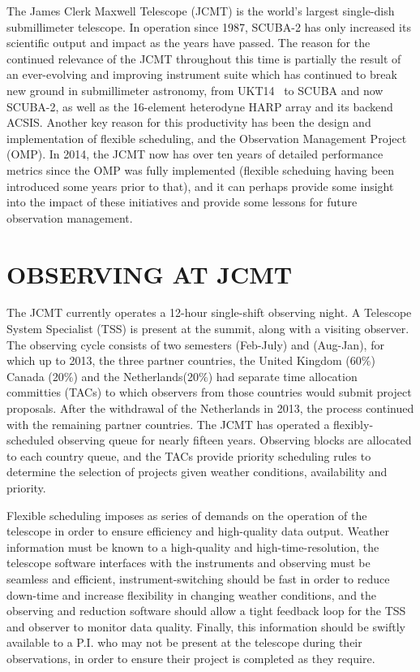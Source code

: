 \documentclass[]{spie}  %
\begin{document}
The James Clerk Maxwell Telescope (JCMT) is the world's largest
single-dish submillimeter telescope. In operation since 1987, SCUBA-2
has only increased its scientific output and impact as the years have
passed. The reason for the continued relevance of the JCMT throughout
this time is partially the result of an ever-evolving and improving
instrument suite which has continued to break new ground in
submillimeter astronomy, from UKT14~\cite{1990MNRAS.243..126D} to SCUBA \cite{holland1999}
and now SCUBA-2\cite{holland2013}, as well as the 16-element heterodyne
HARP array\cite{buckle} and its backend ACSIS\cite{2000SPIE.4015..114H}. Another key
reason for this productivity has been the design and implementation of
flexible scheduling\cite{1998SPIE.3349..126W,tilanus2000,robson2002}, and the Observation
Management Project (OMP)\cite{economou2002}.  In 2014, the JCMT now
has over ten years of detailed performance metrics since the OMP was
fully implemented (flexible scheduing having been introduced some
years prior to that), and it can perhaps provide some insight into the
impact of these initiatives and provide some lessons for future
observation management.


\section{OBSERVING AT JCMT}

The JCMT currently operates a 12-hour single-shift observing night. A
Telescope System Specialist (TSS) is present at the summit, along with
a visiting observer. The observing cycle consists of two semesters
(Feb-July) and (Aug-Jan), for which up to 2013, the three partner
countries, the United Kingdom (60$\%$) Canada (20$\%$) and the
Netherlands(20$\%$) had separate time allocation committies (TACs) to
which observers from those countries would submit project
proposals. After the withdrawal of the Netherlands in 2013, the
process continued with the remaining partner countries. The JCMT has
operated a flexibly-scheduled observing queue for nearly fifteen
years. Observing blocks are allocated to each country queue, and the
TACs provide priority scheduling rules to determine the selection of
projects given weather conditions, availability and priority.

Flexible scheduling imposes as series of demands on the operation of
the telescope in order to ensure efficiency and high-quality data
output. Weather information must be known to a high-quality and
high-time-resolution, the telescope software interfaces with the
instruments and observing must be seamless and efficient,
instrument-switching should be fast in order to reduce down-time and
increase flexibility in changing weather conditions, and the observing
and reduction software should allow a tight feedback loop for the TSS
and observer to monitor data quality. Finally, this information should
be swiftly available to a P.I. who may not be present at the telescope
during their observations, in order to ensure their project is
completed as they require.
\end{document}
